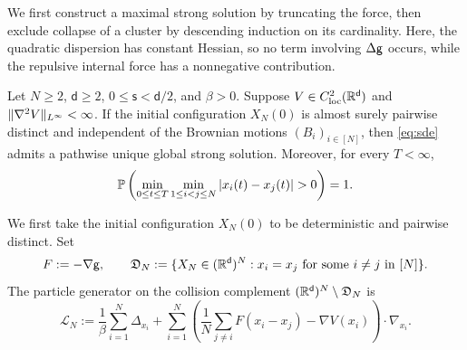 \documentclass[11pt,reqno]{amsart}
\numberwithin{equation}{section}
\theoremstyle{plain}
\theoremstyle{remark}
\DeclarePairedDelimiter{\norm}{\lVert}{\rVert}
\renewcommand{\d}{\mathsf{d}}\newcommand{\s}{\mathsf{s}}
\begin{document}
We first construct a maximal strong solution by truncating the force, then exclude collapse of a cluster by descending induction on its cardinality. Here, the quadratic dispersion has constant Hessian, so no term involving $\Delta\mathsf g$ occurs, while the repulsive internal force has a nonnegative contribution.

\begin{prop}\label{prop:particle-wellposedness}
Let $N\ge2$, $\d\ge2$, $0\le\s<\d/2$, and $\beta>0$. Suppose $V\in C_{\mathrm{loc}}^2(\R^\d)$ and $\norm{\nabla^2V}_{L^\infty}<\infty$. If the initial configuration $X_N(0)$ is almost surely pairwise distinct and independent of the Brownian motions $(B_i)_{i\in[N]}$, then \eqref{eq:sde} admits a pathwise unique global strong solution. Moreover, for every $T<\infty$,
\begin{equation}\label{eq:particle-uniform-separation}
 \Pb\left(\min_{0\le t\le T}\min_{1\le i<j\le N}|x_i(t)-x_j(t)|>0\right)=1.
\end{equation}
\end{prop}

We first take the initial configuration $X_N(0)$ to be deterministic and pairwise distinct. Set
\begin{equation}\label{eq:particle-collision-set}
 F:=-\nabla\g,\qquad
 \mathfrak D_N:=\{X_N\in(\R^\d)^N:x_i=x_j\text{ for some }i\ne j\text{ in }[N]\}.
\end{equation}
The particle generator on the collision complement $(\R^\d)^N\setminus\mathfrak D_N$ is
\begin{equation}\label{eq:particle-generator-noncollision}
 \mathcal L_N:=\frac1\beta\sum_{i=1}^N\Delta_{x_i}
 +\sum_{i=1}^N\left(\frac1N\sum_{j\ne i}F(x_i-x_j)-\nabla V(x_i)\right)\cdot\nabla_{x_i}.
\end{equation}
\end{document}

